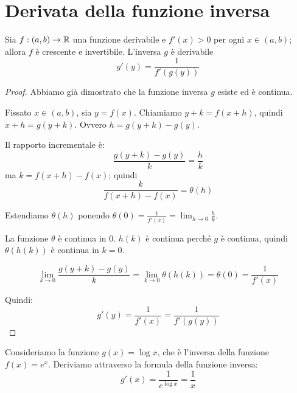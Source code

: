 \section{Derivata della funzione inversa}

\begin{theorem}
Sia $f:(a,b) \to \mathbb R$ una funzione derivabile e $f'(x) > 0$ per ogni $x \in (a,b)$; allora $f$ è crescente e invertibile. L'inversa $g$ è derivabile
\begin{equation*}
g'(y) = \frac{1}{f'(g(y))}
\end{equation*}
\end{theorem}

\begin{proof}
Abbiamo già dimostrato che la funzione inversa $g$ esiste ed è continua.

Fissato $x \in (a,b)$, sia $y = f(x)$. Chiamiamo $y + k = f(x+h)$, quindi $x + h = g(y+k)$. Ovvero $h = g(y+k) - g(y)$.

Il rapporto incrementale è:
\begin{equation*}
\frac{g(y+k)-g(y)}{k} = \frac{h}{k}
\end{equation*}
ma $k = f(x+h)-f(x)$; quindi
\begin{equation*}
\frac{k}{f(x+h)-f(x)} = \theta(h)
\end{equation*}

Estendiamo $\theta(h)$ ponendo $\theta(0) = \frac{1}{f'(x)} = \lim_{h \to 0} \frac{h}{k}$. 

La funzione $\theta$ è continua in 0. $h(k)$ è continua perché $g$ è continua, quindi $\theta(h(k))$ è continua in $k=0$.

\begin{equation*}
\lim_{k \to 0} \frac{g(y+k)-g(y)}{k} = \lim_{k \to 0} \theta(h(k)) = \theta(0) = \frac{1}{f'(x)}
\end{equation*}

Quindi:
\begin{equation*}
g'(y) = \frac{1}{f'(x)} = \frac{1}{f'(g(y))}
\end{equation*}
\end{proof}

\begin{example}
Consideriamo la funzione $g(x) = \log x$, che è l'inversa della funzione $f(x) = e^x$. Deriviamo attraverso la formula della funzione inversa:
\begin{equation*}
g'(x) = \frac{1}{e^{\log x}} = \frac{1}{x}
\end{equation*}
\end{example}

